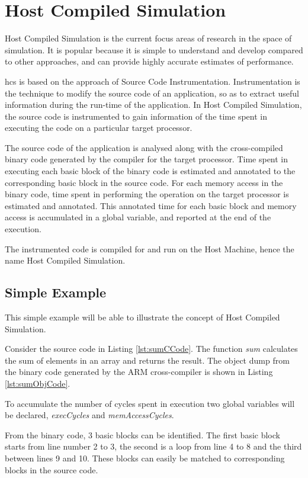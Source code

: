 \chapter{Host Compiled Simulation}

Host Compiled Simulation is the current focus areas of research in the space of simulation. It is popular because it is simple to understand and develop compared to other approaches, and can provide highly accurate estimates of performance.

\gls{hcs} is based on the approach of Source Code Instrumentation. Instrumentation is the technique to modify the source code of an application, so as to extract useful information during the run-time of the application. In Host Compiled Simulation, the source code is instrumented to gain information of the time spent in executing the code on a particular target processor.

The source code of the application is analysed along with the cross-compiled binary code generated by the compiler for the target processor. Time spent in executing each basic block of the binary code is estimated and annotated to the corresponding basic block in the source code. For each memory access in the binary code, time spent in performing the operation on the target processor is estimated and annotated. This annotated time for each basic block and memory access is accumulated in a global variable, and reported at the end of the execution. 

The instrumented code is compiled for and run on the Host Machine, hence the name Host Compiled Simulation.

\section{Simple Example}
This simple example will be able to illustrate the concept of Host Compiled Simulation.

Consider the source code in Listing \ref{lst:sumCCode}. The function \textit{sum} calculates the sum of elements in an array and returns the result. The object dump from the binary code generated by the ARM cross-compiler is shown in Listing \ref{lst:sumObjCode}.

To accumulate the number of cycles spent in execution two global variables will be declared, \textit{execCycles} and \textit{memAccessCycles}.

From the binary code, 3 basic blocks can be identified. The first basic block starts from line number 2 to 3, the second is a loop from line 4 to 8 and the third between lines 9 and 10. These blocks can easily be matched to corresponding blocks in the source code.

